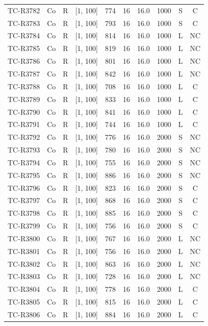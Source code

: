 \begin{longtable}{lccccccccc}
TC-R3782 & Co & R & [1, 100] & 774 & 16 & 16.0 & 1000 & S & C \\
TC-R3783 & Co & R & [1, 100] & 793 & 16 & 16.0 & 1000 & S & C \\
TC-R3784 & Co & R & [1, 100] & 814 & 16 & 16.0 & 1000 & L & NC \\
TC-R3785 & Co & R & [1, 100] & 819 & 16 & 16.0 & 1000 & L & NC \\
TC-R3786 & Co & R & [1, 100] & 801 & 16 & 16.0 & 1000 & L & NC \\
TC-R3787 & Co & R & [1, 100] & 842 & 16 & 16.0 & 1000 & L & NC \\
TC-R3788 & Co & R & [1, 100] & 708 & 16 & 16.0 & 1000 & L & C \\
TC-R3789 & Co & R & [1, 100] & 833 & 16 & 16.0 & 1000 & L & C \\
TC-R3790 & Co & R & [1, 100] & 841 & 16 & 16.0 & 1000 & L & C \\
TC-R3791 & Co & R & [1, 100] & 744 & 16 & 16.0 & 1000 & L & C \\
TC-R3792 & Co & R & [1, 100] & 776 & 16 & 16.0 & 2000 & S & NC \\
TC-R3793 & Co & R & [1, 100] & 780 & 16 & 16.0 & 2000 & S & NC \\
TC-R3794 & Co & R & [1, 100] & 755 & 16 & 16.0 & 2000 & S & NC \\
TC-R3795 & Co & R & [1, 100] & 886 & 16 & 16.0 & 2000 & S & NC \\
TC-R3796 & Co & R & [1, 100] & 823 & 16 & 16.0 & 2000 & S & C \\
TC-R3797 & Co & R & [1, 100] & 868 & 16 & 16.0 & 2000 & S & C \\
TC-R3798 & Co & R & [1, 100] & 885 & 16 & 16.0 & 2000 & S & C \\
TC-R3799 & Co & R & [1, 100] & 756 & 16 & 16.0 & 2000 & S & C \\
TC-R3800 & Co & R & [1, 100] & 767 & 16 & 16.0 & 2000 & L & NC \\
TC-R3801 & Co & R & [1, 100] & 756 & 16 & 16.0 & 2000 & L & NC \\
TC-R3802 & Co & R & [1, 100] & 863 & 16 & 16.0 & 2000 & L & NC \\
TC-R3803 & Co & R & [1, 100] & 728 & 16 & 16.0 & 2000 & L & NC \\
TC-R3804 & Co & R & [1, 100] & 778 & 16 & 16.0 & 2000 & L & C \\
TC-R3805 & Co & R & [1, 100] & 815 & 16 & 16.0 & 2000 & L & C \\
TC-R3806 & Co & R & [1, 100] & 884 & 16 & 16.0 & 2000 & L & C \\

\end{longtable}
